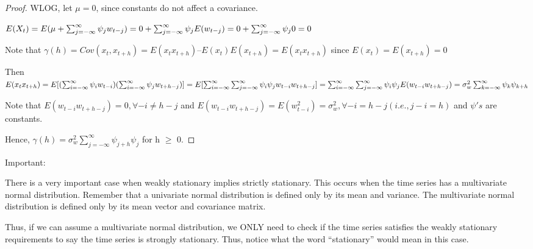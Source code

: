 \documentclass[
]{book}
\theoremstyle{definition}
\theoremstyle{definition}
\theoremstyle{definition}
\theoremstyle{definition}
\theoremstyle{remark}
\begin{document}
\begin{proof}
WLOG, let \(\mu=0\), since constants do not affect a covariance.

\(E(X_t)=E(\mu+\sum_{j=-\infty}^{\infty} \psi_jw_{t-j})\\=0+\sum_{j=-\infty}^{\infty} \psi_jE(w_{t-j})\\=0+\sum_{j=-\infty}^{\infty} \psi_j0=0\)

Note that \(\gamma(h) = Cov(x_t, x_{t+h}) = E(x_tx_{t+h}) – E(x_t)E(x_{t+h}) = E(x_tx_{t+h})\) since \(E(x_t) = E(x_{t+h}) = 0\)

Then \(E(x_tx_{t+h})=E[(\sum_{i=-\infty}^{\infty}\psi_iw_{t-i})(\sum_{i=-\infty}^{\infty}\psi_jw_{t+h-j})]\\=E[\sum_{i=-\infty}^{\infty}\sum_{j=-\infty}^{\infty}\psi_i\psi_jw_{t-i}w_{t+h-j}]\\=\sum_{i=-\infty}^{\infty}\sum_{j=-\infty}^{\infty}\psi_i\psi_jE(w_{t-i}w_{t+h-j})\\=\sigma^2_w\sum_{k=-\infty}^{\infty}\psi_k\psi_{k+h}\)

Note that \(E(w_{t-i}w_{t+h-j})=0, \forall -i\ne{h-j}\) and \(E(w_{t-i}w_{t+h-j})=E(w^2_{t-i})=\sigma^2_w ,\forall -i=h-j ( i.e.,j-i=h)\) and \(\psi's\) are constants.

Hence, \(\gamma(h)=\sigma^2_w\sum_{j=-\infty}^{\infty}\psi_{j+h}\psi_j\) for h \(\geq\) 0.
\end{proof}

Important:

There is a very important case when weakly stationary implies strictly stationary. This occurs when the time series has a multivariate normal distribution. Remember that a univariate normal distribution is defined only by its mean and variance. The multivariate normal distribution is defined only by its mean vector and covariance matrix.

Thus, if we can assume a multivariate normal distribution, we ONLY need to check if the time series satisfies the weakly stationary requirements to say the time series is strongly stationary. Thus, notice what the word ``stationary'' would mean in this case.
\end{document}
